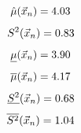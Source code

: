 \documentclass[12pt]{report}
\begin{document}
\begin{equation*}
    \hat\mu(\vec x_n) = 4.03\\
\end{equation*}
\begin{equation*}
    S^2(\vec x_n) = 0.83\\
\end{equation*}
\begin{equation*}
    \underline\mu(\vec x_n) = 3.90\\
\end{equation*}
\begin{equation*}
    \overline\mu(\vec x_n) =  4.17\\
\end{equation*}
\begin{equation*}
    \underline{S^2}(\vec x_n) = 0.68\\
\end{equation*}
\begin{equation*}
    \overline{S^2}(\vec x_n) = 1.04\\
\end{equation*}


\begin{figure}[ht!]	
\end{figure}
\end{document}
